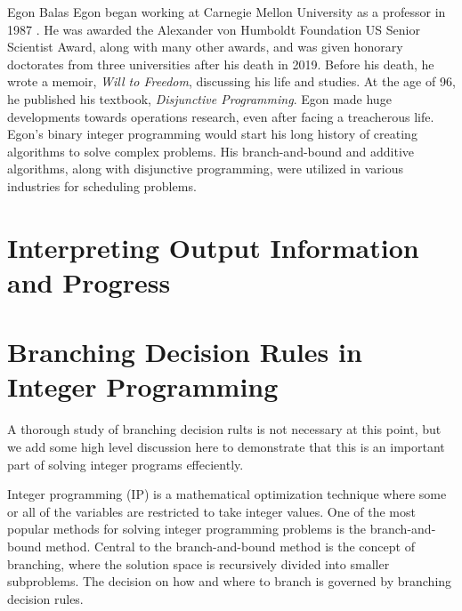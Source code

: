 \begin{refsection}
\begin{pioneerspotlight}{Egon Balas}
Egon began working at Carnegie Mellon University as a professor in 1987 \parencite{cornuejols_2019_egon}. He was awarded the Alexander von Humboldt Foundation US Senior Scientist Award, along with many other awards, and was given honorary doctorates from three universities after his death in 2019. Before his death, he wrote a memoir, \textit{Will to Freedom}, discussing his life and studies. At the age of 96, he published his textbook, \textit{Disjunctive Programming}. Egon made huge developments towards operations research, even after facing a treacherous life. Egon’s binary integer programming would start his long history of creating algorithms to solve complex problems. His branch-and-bound and additive algorithms, along with disjunctive programming, were utilized in various industries for scheduling problems. 

\printbibliography[heading=subbibliography]
\end{pioneerspotlight}
\end{refsection} 

\section{Interpreting Output Information and Progress}
\label{sec:solver-output}



\section{Branching Decision Rules in Integer Programming}
\label{sec:branching-rules}
\begin{outcome}
A thorough study of branching decision rults is not necessary at this point, but we add some high level discussion here to demonstrate that this is an important part of solving integer programs effeciently.
\end{outcome}

Integer programming (IP) is a mathematical optimization technique where some or all of the variables are restricted to take integer values. One of the most popular methods for solving integer programming problems is the branch-and-bound method. Central to the branch-and-bound method is the concept of branching, where the solution space is recursively divided into smaller subproblems. The decision on how and where to branch is governed by branching decision rules.

